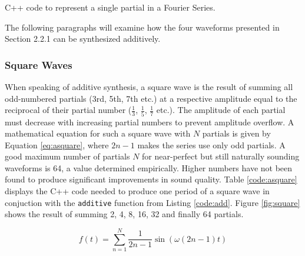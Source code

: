 \begin{table}
  \caption{C++ code to represent a single partial in a Fourier Series.}
  \label{code:partial}
\end{table}

\noindent The following paragraphs will examine how the four waveforms presented in Section 2.2.1 can be synthesized additively.

\subsubsection{Square Waves}

When speaking of additive synthesis, a square wave is the result of summing all odd-numbered partials (3rd, 5th, 7th etc.) at a respective amplitude equal to the reciprocal of their partial number ($\frac{1}{3}$, $\frac{1}{5}$, $\frac{1}{7}$ etc.). The amplitude of each partial must decrease with increasing partial numbers to prevent amplitude overflow. A mathematical equation for such a square wave with $N$ partials is given by Equation \ref{eq:asquare}, where $2n - 1$ makes the series use only odd partials. A good maximum number of partials $N$ for near-perfect but still naturally sounding waveforms is 64, a value determined empirically. Higher numbers have not been found to produce significant improvements in sound quality. Table \ref{code:asquare} displays the C++ code needed to produce one period of a square wave in conjuction with the \texttt{additive} function from Listing \ref{code:add}. Figure \ref{fig:square} shows the result of summing 2, 4, 8, 16, 32 and finally 64 partials.

\begin{equation}
  f(t) = \sum\limits_{n=1}^N \frac{1}{2n -1} \sin(\omega (2n - 1) t)
  \label{eq:asquare}
\end{equation}

